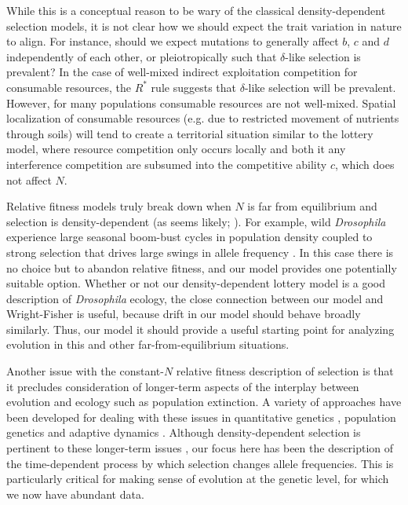 \documentclass[12pt]{article}
\begin{document}
While this is a conceptual reason to be wary of the classical density-dependent selection models, it is not clear how we should expect the trait variation in nature to align. For instance, should we expect mutations to generally affect $b$, $c$ and $d$ independently of each other, or pleiotropically such that $\delta$-like selection is prevalent? In the case of well-mixed indirect exploitation competition for consumable resources, the $R^*$ rule  suggests that $\delta$-like selection will be prevalent. However, for many populations consumable resources are not well-mixed. Spatial localization of consumable resources (e.g. due to restricted movement of  nutrients through soils) will tend to create a territorial situation similar to the lottery model, where resource competition only occurs locally and both it any interference competition are subsumed into the competitive ability $c$, which does not affect $N$. 

Relative fitness models truly break down when $N$ is far from equilibrium and selection is density-dependent (as seems likely; \citealt{travis_2013}). For example, wild \textit{Drosophila} experience large seasonal boom-bust cycles in population density coupled to strong selection that drives large swings in allele frequency \citep{bergland_14}. In this case there is no choice but to abandon relative fitness, and our model provides one potentially suitable option. Whether or not our density-dependent lottery model is a good description of \textit{Drosophila} ecology, the close connection between our model and Wright-Fisher is useful, because drift in our model should behave broadly similarly. Thus, our model it should provide a useful starting point for analyzing evolution in this and other far-from-equilibrium situations. 

Another issue with the constant-$N$ relative fitness description of selection is that it precludes consideration of longer-term aspects of the interplay between evolution and ecology such as population extinction. A variety of approaches have been developed for dealing with these issues in quantitative genetics \citep{burger1995evolution,engen_2013}, population genetics \citep{bertram2017predicting} and adaptive dynamics \citep{ferriere2013eco,dieckmann2004adaptive}. Although density-dependent selection is  pertinent to these longer-term issues \citep{travis_2013}, our focus here has been the description of the time-dependent process by which selection changes allele frequencies. This is particularly critical for making sense of evolution at the genetic level, for which we now have abundant data.
\end{document}
